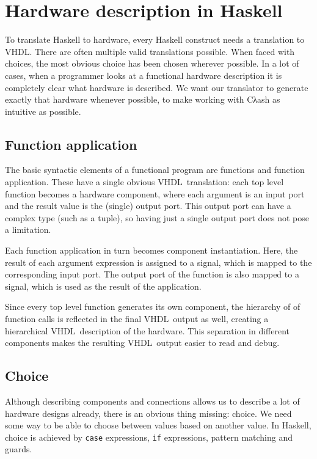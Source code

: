 \documentclass[conference]{IEEEtran}
\def\VHDL{\textsc{VHDL}}
\def\hs#1{\texttt{#1}}
\begin{document}
\section{Hardware description in Haskell}

  To translate Haskell to hardware, every Haskell construct needs a
  translation to \VHDL. There are often multiple valid translations
  possible. When faced with choices, the most obvious choice has been
  chosen wherever possible. In a lot of cases, when a programmer looks
  at a functional hardware description it is completely clear what
  hardware is described. We want our translator to generate exactly that
  hardware whenever possible, to make working with Cλash as intuitive as
  possible.

  \subsection{Function application}
    The basic syntactic elements of a functional program are functions
    and function application. These have a single obvious \VHDL\
    translation: each top level function becomes a hardware component,
    where each argument is an input port and the result value is the
    (single) output port. This output port can have a complex type (such
    as a tuple), so having just a single output port does not pose a
    limitation.

    Each function application in turn becomes component instantiation.
    Here, the result of each argument expression is assigned to a
    signal, which is mapped to the corresponding input port. The output
    port of the function is also mapped to a signal, which is used as
    the result of the application.

    Since every top level function generates its own component, the
    hierarchy of of function calls is reflected in the final \VHDL\
    output as well, creating a hierarchical \VHDL\ description of the
    hardware.  This separation in different components makes the
    resulting \VHDL\ output easier to read and debug.

  \subsection{Choice}
    Although describing components and connections allows us to describe
    a lot of hardware designs already, there is an obvious thing
    missing: choice. We need some way to be able to choose between
    values based on another value.  In Haskell, choice is achieved by
    \hs{case} expressions, \hs{if} expressions, pattern matching and
    guards.
\end{document}
